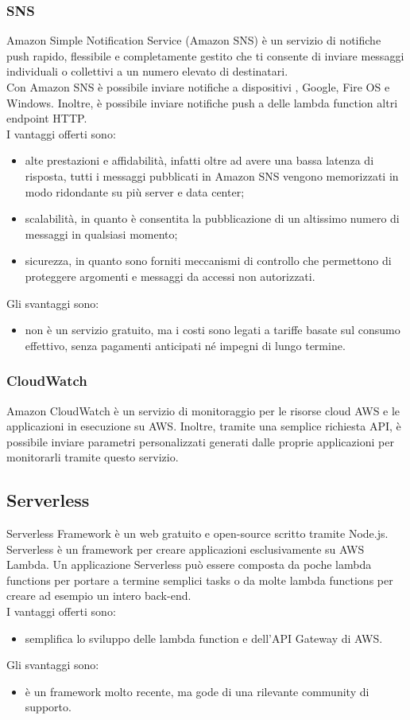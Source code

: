 \subsubsection{SNS}
Amazon Simple Notification Service (Amazon SNS) è un servizio di notifiche push rapido, flessibile e completamente gestito che ti consente di inviare messaggi individuali o collettivi a un numero elevato di destinatari. \\
Con Amazon SNS è possibile inviare notifiche a dispositivi , Google, Fire OS e Windows. Inoltre, è possibile inviare notifiche push a delle lambda function  altri endpoint HTTP. \\
I vantaggi offerti sono:
\begin{itemize}
	\item alte prestazioni e affidabilità, infatti oltre ad avere una bassa latenza di risposta, tutti i messaggi pubblicati in Amazon SNS vengono memorizzati in modo ridondante su più server e data center;
	\item scalabilità, in quanto è consentita la pubblicazione di un altissimo numero di messaggi in qualsiasi momento;
	\item sicurezza, in quanto sono forniti meccanismi di controllo che permettono di proteggere argomenti e messaggi da accessi non autorizzati.
\end{itemize}
Gli svantaggi sono:
\begin{itemize}
	\item non è un servizio gratuito, ma i costi sono legati a tariffe basate sul consumo effettivo, senza pagamenti anticipati né impegni di lungo termine.
\end{itemize}
\subsubsection{CloudWatch}
Amazon CloudWatch è un servizio di monitoraggio per le risorse cloud AWS e le applicazioni in esecuzione su AWS. Inoltre, tramite una semplice richiesta API, è possibile inviare parametri personalizzati generati dalle proprie applicazioni per monitorarli tramite questo servizio.
\subsection{Serverless }
Serverless Framework è un web  gratuito e open-source scritto tramite Node.js. Serverless è un framework per creare applicazioni esclusivamente su AWS Lambda. Un applicazione Serverless può essere composta da poche lambda functions per portare a termine semplici tasks o da molte lambda functions per creare ad esempio un intero back-end.\\
I vantaggi offerti sono:
\begin{itemize}
	\item semplifica lo sviluppo delle lambda function e dell'API Gateway di AWS.
\end{itemize}
Gli svantaggi sono:
\begin{itemize}
	\item è un framework molto recente, ma gode di una rilevante community di supporto.
\end{itemize}
\newpage
